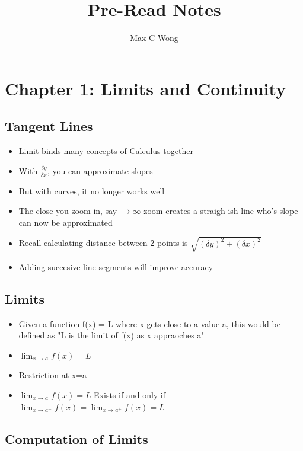 \documentclass{article}
\begin{document}
    \title{Pre-Read Notes}
    \author{Max C Wong}
    \maketitle

    \section{Chapter 1: Limits and Continuity}

    \subsection{Tangent Lines}
    \begin{itemize}
        \item Limit binds many concepts of Calculus together
        \item With $\frac{\delta y}{\delta x}$, you can approximate slopes
        \item But with curves, it no longer works well
        \item The close you zoom in, say $\rightarrow \infty$ zoom creates a straigh-ish line who's slope can now be approximated
        \item Recall calculating distance between 2 points is $\sqrt{(\delta y)^2 + (\delta x)^2}$
        \item Adding succesive line segments will improve accuracy
    \end{itemize}

    \subsection{Limits}
    \begin{itemize}
        \item Given a function f(x) = L where x gets close to a value a, this would be defined as "L is the limit of f(x) as x appraoches a"
        \item $\lim_{x \to a} f(x)=L$
        \item Restriction at x=a
        \item $\lim_{x \to a} f(x)=L$ Exists if and only if $\lim_{x \to a^-} f(x) = \lim_{x \to a^+} f(x) = L$
    \end{itemize}

    \subsection{Computation of Limits}
\end{document}

